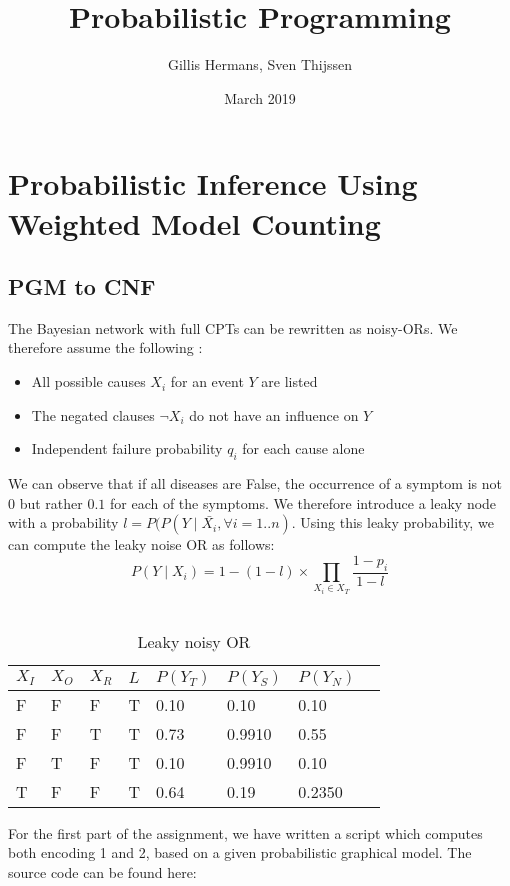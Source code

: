 \documentclass{article}
\title{Probabilistic Programming}
\author{Gillis Hermans, Sven Thijssen}
\date{March 2019}
\begin{document}
\maketitle

\section{Probabilistic Inference Using Weighted Model Counting}

\subsection{PGM to CNF}

The Bayesian network with full CPTs can be rewritten as noisy-ORs. We therefore assume the following \cite{noisyor}:
\begin{itemize}
    \item All possible causes $X_i$ for an event $Y$ are listed
    \item The negated clauses $\neg X_i$ do not have an influence on $Y$
    \item Independent failure probability $q_i$ for each cause alone
\end{itemize}

We can observe that if all diseases are False, the occurrence of a symptom is not $0$ but rather $0.1$ for each of the symptoms. We therefore introduce a leaky node with a probability $l = P(P(Y \mid \bar{X_i}, \forall i = 1..n)$.
Using this leaky probability, we can compute the leaky noise OR as follows:
$$P(Y \mid X_i) = 1-(1-l) \times \prod_{X_i \in X_T}\frac{1-p_i}{1-l}$$\\

\begin{table}[h]
\centering
\begin{tabular}{l l l l | l | l | l | l}
	\hline
	$X_I$	&	$X_O$	&	$X_R$	&	$L$		&	$P(Y_T)$		&	$P(Y_S)$		&	$P(Y_N)$\\
	\hline
	F		&	F		&	F		&	T		&	0.10			&	0.10			&	0.10\\
	F		&	F		&	T		&	T		&	0.73			&	0.9910		&	0.55\\
	F		&	T		&	F		&	T		&	0.10			&	0.9910		&	0.10\\
	T		&	F		&	F		&	T		&	0.64			&	0.19			&	0.2350\\
	\hline
\end{tabular}
\caption{Leaky noisy OR}
\end{table}

For the first part of the assignment, we have written a script which computes both encoding 1 and 2, based on a given probabilistic graphical model. The source code can be found here:
\end{document}

